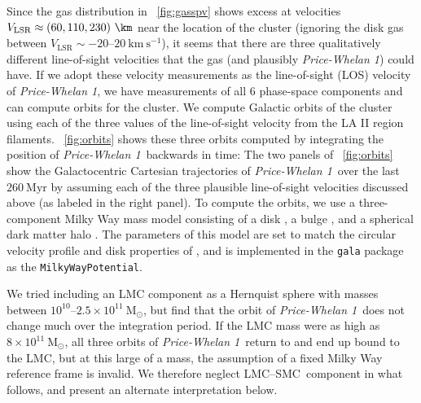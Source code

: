 \documentclass[twocolumn]{aastex62}
\newcommand{\msun}{\textrm{M}_\odot}
\newcommand{\kms}{\ensuremath{\textrm{km}~\textrm{s}^{-1}}}
\newcommand{\clustername}{\textsl{Price-Whelan 1}}
\newcommand{\lmcsmc}{LMC--SMC}
\begin{document}
Since the gas distribution in \figurename~\ref{fig:gasspv} shows excess at velocities $V_{\textrm{LSR}} \approx (60, 110, 230)~\km$ near the location of the cluster (ignoring the disk gas between $V_{\textrm{LSR}} \sim -20$--$20~\kms$), it seems that there are three qualitatively different line-of-sight velocities that the gas (and plausibly \clustername) could have.
If we adopt these velocity measurements as the line-of-sight (LOS) velocity of \clustername, we have measurements of all 6 phase-space components and can compute orbits for the cluster.
We compute Galactic orbits of the cluster using each of the three values of the line-of-sight velocity from the LA II region filaments.
\figurename~\ref{fig:orbits} shows these three orbits computed by integrating the position of \clustername\ backwards in time:
The two panels of \figurename~\ref{fig:orbits} show the Galactocentric Cartesian trajectories of \clustername\ over the last $260~\textrm{Myr}$ by assuming each of the three plausible line-of-sight velocities discussed above (as labeled in the right panel).
To compute the orbits, we use a three-component Milky Way mass model consisting of a disk \citep{Miyamoto:1975}, a bulge \citep{Hernquist:1990}, and a spherical dark matter halo \citep{Navarro:1996}.
The parameters of this model are set to match the circular velocity profile and disk properties of \citet{Bovy:2015}, and is implemented in the \texttt{gala} package \citep{gala} as the \texttt{MilkyWayPotential}.

We tried including an LMC component as a Hernquist sphere \citep{Hernquist:1990} with masses between $10^{10}$--$2.5\times 10^{11}~\msun$, but find that the orbit of \clustername\ does not change much over the integration period.
If the LMC mass were as high as $8\times 10^{11}~\msun$, all three orbits of \clustername\ return to and end up bound to the LMC, but at this large of a mass, the assumption of a fixed Milky Way reference frame is invalid.
We therefore neglect \lmcsmc\ component in what follows, and present an alternate interpretation below.
\end{document}
